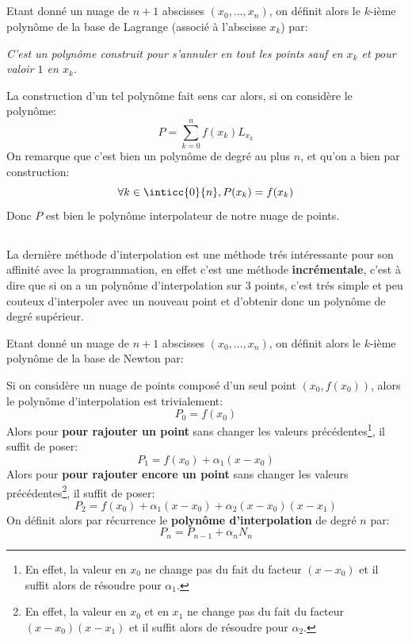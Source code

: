 \subsection*{}
Etant donné un nuage de \(n + 1\) abscisses \((x_0, \ldots, x_n)\), on définit alors le \(k\)-ième polynôme de la base de Lagrange (associé à l'abscisse \(x_k\)) par:
\begin{center}
   \textit{C'est un polynôme construit pour s'annuler en tout les points sauf en \(x_k\) et pour valoir \(1\) en \(x_k\).}
\end{center}
La construction d'un tel polynôme fait sens car alors, si on considère le polynôme:
\[
   P = \sum_{k=0}^{n}f(x_k)L_{x_k}
\]
On remarque que c'est bien un polynôme de degré au plus \(n\), et qu'on a bien par construction: 
\[
   \forall k \in \inticc{0}{n} , P(x_k) = f(x_k)
\] 
Donc \(P\) est bien le polynôme interpolateur de notre nuage de points.
\subsection*{}
La dernière méthode d'interpolation est une méthode trés intéressante pour son affinité avec la programmation, en effet c'est une méthode \textbf{incrémentale}, c'est à dire que si on a un polynôme d'interpolation sur \(3\) points, c'est trés simple et peu couteux d'interpoler avec un nouveau point et d'obtenir donc un polynôme de degré supérieur.\<

Etant donné un nuage de \(n + 1\) abscisses \((x_0, \ldots, x_n)\), on définit alors le \(k\)-ième polynôme de la base de Newton par:

Si on considère un nuage de points composé d'un seul point \((x_0, f(x_0))\), alors le polynôme d'interpolation est trivialement:
\[
   P_0 = f(x_0)
\]
Alors pour \textbf{pour rajouter un point} sans changer les valeurs précédentes\footnote[1]{En effet, la valeur en \(x_0\) ne change pas du fait du facteur \((x-x_0)\) et il suffit alors de résoudre pour \(\alpha_1\).
}, il suffit de poser:
\[
   P_1 = f(x_0) + \alpha_1(x - x_0)
\]
Alors pour \textbf{pour rajouter encore un point} sans changer les valeurs précédentes\footnote[2]{En effet, la valeur en \(x_0\) et en \(x_1\) ne change pas du fait du facteur \((x-x_0)(x-x_1)\) et il suffit alors de résoudre pour \(\alpha_2\).}, il suffit de poser:
\[
   P_2 = f(x_0) + \alpha_1(x - x_0) + \alpha_2(x-x_0)(x-x_1)
\]
On définit alors par récurrence le \textbf{polynôme d'interpolation} de degré \(n\) par:
\[
   P_n = P_{n-1} + \alpha_{n}N_n
\]

